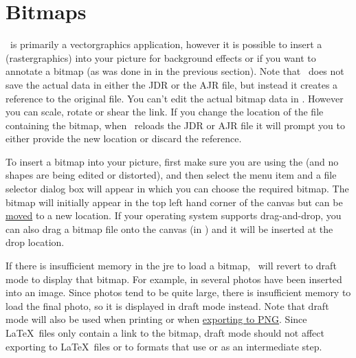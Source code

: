
\chapter{Bitmaps}\label{sec:insertbitmap}


\FlowframTk\ is primarily a \gls{vectorgraphics} application,
however it is possible to insert a 
(\gls{rastergraphics}) into your picture for background effects or
if you want to annotate a \gls{bitmap} (as was done in
 in the previous section).  Note that
\FlowframTk\ does not save the actual  data in either
the \gls{JDR} or the \gls{AJR} file, but instead it creates a reference
to the original file. You can't edit the actual bitmap data in
\FlowframTk. However you can scale, rotate or shear the link.  If
you change the location of the file containing the bitmap, when
\FlowframTk\ reloads the \gls*{JDR} or \gls*{AJR} file it will
prompt you to either provide the new location or discard the reference.


To insert a \gls{bitmap} into your picture, first make sure you are using
the  (and no shapes are
being edited or distorted), and then select the menu item
 and a file selector dialog box will appear in which
you can choose the required \gls{bitmap}. The \gls{bitmap} will initially appear
in the top left hand corner of the \gls{canvas} but can be
\hyperref[sec:moveobjects]{moved} to a new location.  If your
operating system supports \gls{drag-and-drop}, you can also drag a
\gls{bitmap} file onto the \gls{canvas} (in \selectmode) and it will
be inserted at the drop location.

If there is insufficient memory in the \gls{jre} to load a bitmap,
\FlowframTk\ will revert to draft mode to display that bitmap.  For
example, in  several photos have been
inserted into an image. Since photos tend to be quite large, there
is insufficient memory to load the final photo, so it is displayed
in draft mode instead. Note that draft mode will also be used when
printing or when \hyperref[sec:exportpng]{exporting to PNG}. Since \LaTeX\ files
only contain a link to the bitmap, draft mode should not affect
exporting to \LaTeX\ files or to formats that use  or
 as an intermediate step.

